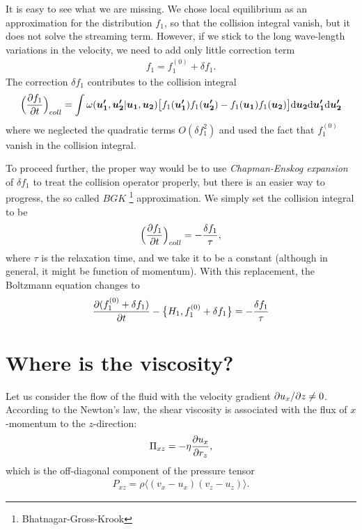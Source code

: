 It is easy to see what we are missing. We chose local equilibrium as an approximation for the distribution $f_1$, so that the collision integral vanish, but it does not solve the streaming term. However, if we stick to the long wave-length variations in the velocity, we need to add only little correction term
\begin{align} \label{cord}
f_1 = f_1^{(0)} + \delta f_1.
\end{align}
The correction $\delta f_1$ contributes to the collision integral
\begin{align*}
\Big( \frac{\partial f_1}{\partial t} \Big)_{coll}= \int \omega(\bm{u'_1},\bm{u'_2} | \bm{u_1}, \bm{u_2}) \big[ f_1(\bm{u'_1})f_1(\bm{u'_2}) - f_1(\bm{u_1})f_1(\bm{u_2}) \big] \mathrm{d} \bm{u_2} \mathrm{d} \bm{u'_1} \mathrm{d} \bm{u'_2}
\end{align*}
where we neglected the quadratic terms $O(\delta f_1^2)$ and used the fact that $f_1^{(0)}$ vanish in the collision integral.

To proceed further, the proper way would be to use \textit{Chapman-Enskog expansion} of $\delta f_1$ to treat the collision operator properly, but there is an easier way to progress, the so called $BGK$ \footnote{Bhatnagar-Gross-Krook} approximation. We simply set the collision integral to be
\begin{align} \label{bgk}
\Big( \frac{\partial f_1}{\partial t} \Big)_{coll} = - \frac{\delta f_1}{\tau},
\end{align}
where $\tau$ is the relaxation time, and we take it to be a constant (although in general, it might be function of momentum).
With this replacement, the Boltzmann equation changes to
\begin{align*}
\frac{\partial (f_1^{(0)} + \delta f_1)}{\partial t} - \big\{ H_1, f_1^{(0)} + \delta f_1 \big\} = -\frac{\delta f_1}{\tau}
\end{align*}

\section{Where is the viscosity?}
Let us consider the flow of the fluid with the velocity gradient $\partial u_x / \partial z \neq 0$.
According to the Newton's law, the shear viscosity is associated with the flux of $x$-momentum to the $z$-direction:
\begin{align} \label{newt}
\Pi_{xz} = -\eta \frac{\partial u_x}{\partial r_z},
\end{align}
which is the off-diagonal component of the pressure tensor
\begin{align*}
P_{xz} = \rho \langle (v_x - u_x) (v_z - u_z) \rangle.
\end{align*}

